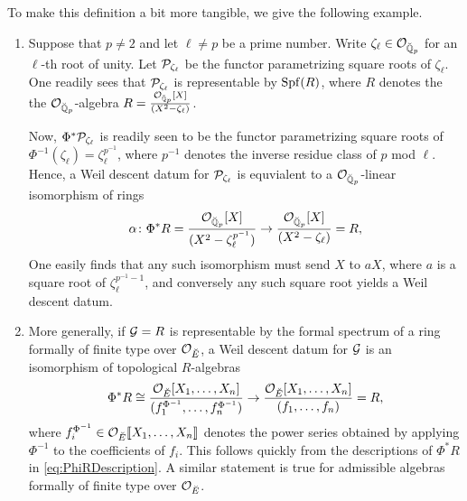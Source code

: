 \documentclass[../main.tex]{subfiles}
\begin{document}
To make this definition a bit more tangible, we give the following example.
\begin{xpl}
  \begin{enumerate}
    \item Suppose that $p \neq 2$ and let $\ell \neq p$ be a prime number. Write 
  $\zeta_\ell \in \mathcal{O}_{{\breve {\mathbb{Q}}}_p}$ for an $\ell$-th root of unity. Let
  $\mathcal{P}_{\zeta_\ell}$ be the functor parametrizing
  square roots of $\zeta_\ell$. One readily sees that $\mathcal{P}_{\zeta_\ell}$ is
  representable by 
  $\operatorname{Spf}(R)$, where $R$ denotes the the $\mathcal{O}_{{\breve {\mathbb{Q}}}_p}$-algebra
  $R = \frac{\mathcal{O}_{{\breve {\mathbb{Q}}}_p}[X]}{(X^2 - \zeta_\ell)}$. 

  Now, $\Phi^*\mathcal{P}_{\zeta_\ell}$ is readily seen to be the functor
  parametrizing square roots of $\Phi^{-1}(\zeta_\ell) = \zeta_\ell^{p^{-1}}$,
  where $p^{-1}$ denotes the inverse residue class of $p$ mod $\ell$. 
  Hence, a Weil descent datum for $\mathcal{P}_{\zeta_\ell}$ is equvialent to a 
  $\mathcal{O}_{{\breve {\mathbb{Q}}}_p}$-linear isomorphism of rings
  \begin{equation*}
    \alpha \colon \Phi^* R = \frac{\mathcal{O}_{{\breve {\mathbb{Q}}}_p}[X]}{(X^2 - \zeta_\ell^{p^{-1}})} \to
    \frac{\mathcal{O}_{{\breve {\mathbb{Q}}}_p}[X]}{(X^2 - \zeta_\ell)} = R, 
  \end{equation*}
  One easily finds that any such isomorphism must send $X$ to $aX$, where $a$
  is a square root of $\zeta_\ell^{p^{-1}-1}$, and conversely any such square
  root yields a Weil descent datum.
    \item More generally, if $\mathcal{G} = R$ is representable by the formal spectrum of a 
      ring formally of finite type over $\mathcal{O}_{{\breve {E}}}$, a Weil descent datum 
      for $\mathcal{G}$ is an isomorphism of topological $R$-algebras
      \begin{equation*}
        \Phi^* R \cong \frac{ \mathcal{O}_{{\breve {E}}} [ X_1, \dots, X_n ]}{(f_1^{\Phi^{-1}},
        \dots, f_n^{\Phi^{-1}})}
        \to 
        \frac{ \mathcal{O}_{{\breve {E}}}[ X_1, \dots, X_n ]}{(f_1, \dots,
        f_n)} = R,
      \end{equation*}
      where $f_i^{\Phi^{-1}} \in \mathcal{O}_{\breve {E}}\llbracket X_1, \dots, X_n\rrbracket$ denotes the 
      power series obtained by applying $\Phi^{-1}$ to the coefficients of $f_i$.
      This follows quickly from the descriptions of $\Phi^*R$ in
      \eqref{eq:PhiRDescription}. A similar statement is true for admissible algebras
      formally of finite type over $\mathcal{O}_{\breve {E}}$.
  \end{enumerate}
\end{xpl}
\end{document}
